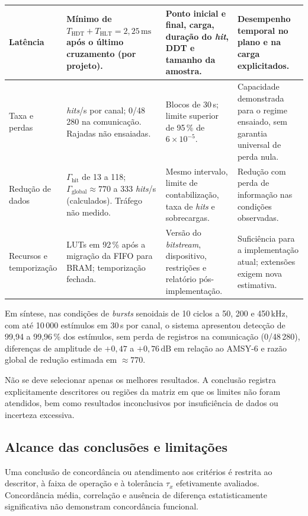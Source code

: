 \begin{longtable}{|
		>{\raggedright\arraybackslash}p{3.2cm}|
		>{\raggedright\arraybackslash}p{4.0cm}|
		>{\raggedright\arraybackslash}p{3.2cm}|
		>{\raggedright\arraybackslash}p{3.8cm}|}
	\hline
	Latência & Mínimo de \(T_{\mathrm{HDT}} + T_{\mathrm{HLT}} = 2{,}25\,\mathrm{ms}\) após o último cruzamento (por projeto). & Ponto inicial e final, carga, duração do \textit{hit}, DDT e tamanho da amostra. & Desempenho temporal no plano e na carga explicitados. \\
	\hline
	Taxa e perdas & 333 \textit{hits}/s por canal; 0/48\,280 na comunicação. Rajadas não ensaiadas. & Blocos de 30\,s; limite superior de 95\,\% de \(6\times10^{-5}\). & Capacidade demonstrada para o regime ensaiado, sem garantia universal de perda nula. \\
	\hline
	Redução de dados & \(\Gamma_{\mathrm{hit}}\) de 13 a 118; \(\Gamma_{\mathrm{global}} \approx 770\) a 333 \textit{hits}/s (calculados). Tráfego não medido. & Mesmo intervalo, limite de contabilização, taxa de \textit{hits} e sobrecargas. & Redução com perda de informação nas condições observadas. \\
	\hline
	Recursos e temporização & LUTs em 92\,\% após a migração da FIFO para BRAM; temporização fechada. & Versão do \textit{bitstream}, dispositivo, restrições e relatório pós-implementação. & Suficiência para a implementação atual; extensões exigem nova estimativa. \\
\end{longtable}
\endgroup

Em síntese, nas condições de \textit{bursts} senoidais de 10 ciclos a 50, 200 e 450\,kHz, com até 10\,000 estímulos em 30\,s por canal, o sistema apresentou detecção de 99,94 a 99,96\,\% dos estímulos, sem perda de registros na comunicação (0/48\,280), diferenças de amplitude de \(+0{,}47\) a \(+0{,}76\,\mathrm{dB}\) em relação ao AMSY-6 e razão global de redução estimada em \(\approx 770\).

Não se deve selecionar apenas os melhores resultados. A conclusão registra explicitamente descritores ou regiões da matriz em que os limites não foram atendidos, bem como resultados inconclusivos por insuficiência de dados ou incerteza excessiva.

\subsection{Alcance das conclusões e limitações}
\label{v2:subsec:alcance_limitacoes_conclusao}

Uma conclusão de concordância ou atendimento aos critérios é restrita ao descritor, à faixa de operação e à tolerância \(\tau_x\) efetivamente avaliados. Concordância média, correlação e ausência de diferença estatisticamente significativa não demonstram concordância funcional.

